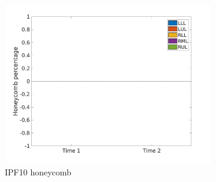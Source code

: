 \begin{figure}[H]
\begin{subfigure}{.46\linewidth}
  \includegraphics[width=\linewidth,trim={{.0\wd0} {.0\wd0} {.0\wd0} {.0\wd0}},clip]{Appendix/Image_AppexA/LobarDistribution/IPF10HoneycombLobarRegionDiseaseDistributionOverTime.jpg} %
  \caption{IPF10 honeycomb}
  \label{fig:IPF10LobarRegionDiseaseDistributionOverTime-c} 
\end{subfigure} 
\hspace{.3in}
\begin{subfigure}{.46\linewidth}%

\end{subfigure}
\end{figure}

